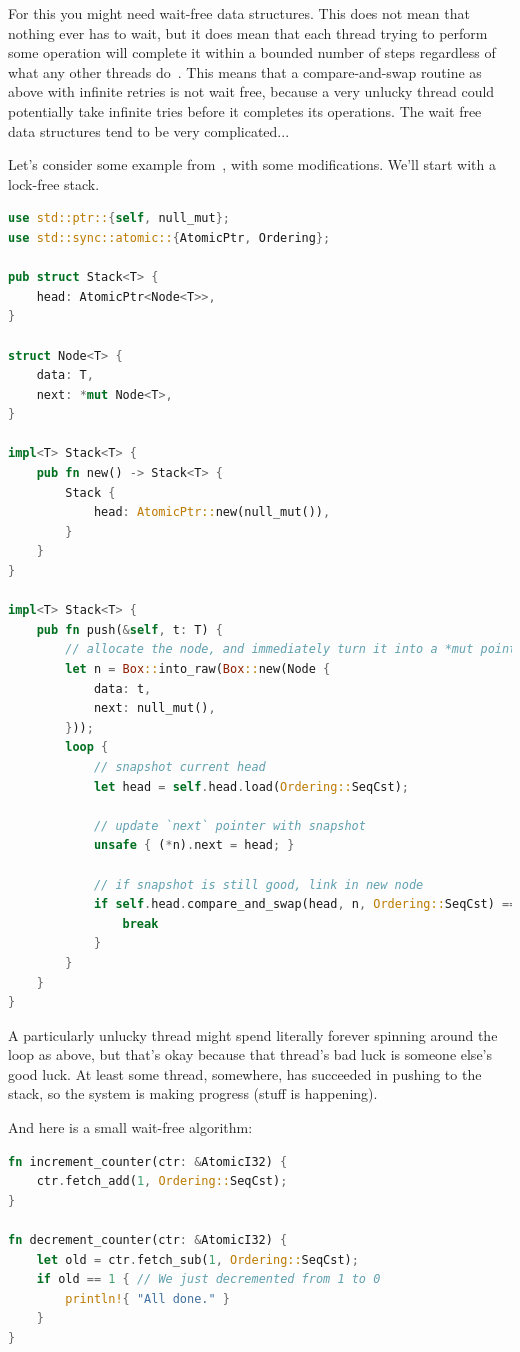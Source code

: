 \documentclass[a4paper]{report}
\begin{document}
For this you might need wait-free data structures. This does not mean that nothing ever has to wait, but it does mean that each thread trying to perform some operation will complete it within a bounded number of steps regardless of what any other threads do~\cite{nblfwf}. This means that a compare-and-swap routine as above with infinite retries is not wait free, because a very unlucky thread could potentially take infinite tries before it completes its operations. The wait free data structures tend to be very complicated...

Let's consider some example from~\cite{lockfreedom}, with some modifications. We'll start with a lock-free stack.
\begin{lstlisting}[language=Rust]
use std::ptr::{self, null_mut};
use std::sync::atomic::{AtomicPtr, Ordering};

pub struct Stack<T> {
    head: AtomicPtr<Node<T>>,
}

struct Node<T> {
    data: T,
    next: *mut Node<T>,
}

impl<T> Stack<T> {
    pub fn new() -> Stack<T> {
        Stack {
            head: AtomicPtr::new(null_mut()),
        }
    }
}

impl<T> Stack<T> {
    pub fn push(&self, t: T) {
        // allocate the node, and immediately turn it into a *mut pointer
        let n = Box::into_raw(Box::new(Node {
            data: t,
            next: null_mut(),
        }));
        loop {
            // snapshot current head
            let head = self.head.load(Ordering::SeqCst);

            // update `next` pointer with snapshot
            unsafe { (*n).next = head; }

            // if snapshot is still good, link in new node
            if self.head.compare_and_swap(head, n, Ordering::SeqCst) == head {
                break
            }
        }
    }
}
\end{lstlisting}

A particularly unlucky thread might spend literally forever spinning around the loop as above, but that's okay because that thread's bad luck is someone else's good luck. At least some thread, somewhere, has succeeded in pushing to the stack, so the system is making progress (stuff is happening). 

And here is a small wait-free algorithm:

\begin{lstlisting}[language=Rust]
fn increment_counter(ctr: &AtomicI32) {
    ctr.fetch_add(1, Ordering::SeqCst);
}

fn decrement_counter(ctr: &AtomicI32) {
    let old = ctr.fetch_sub(1, Ordering::SeqCst);
    if old == 1 { // We just decremented from 1 to 0
        println!{ "All done." }
    }
}
\end{lstlisting}
\end{document}
